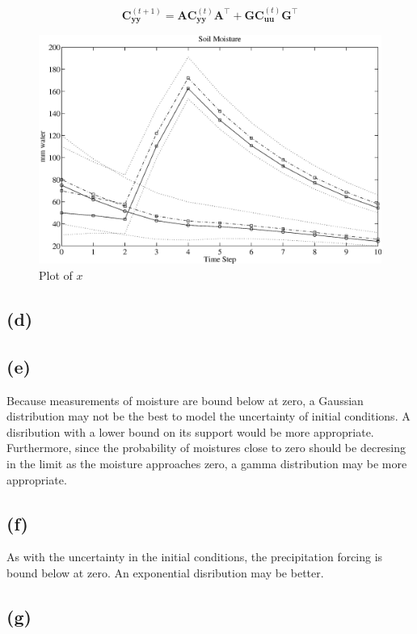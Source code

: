 \documentclass[fleqn, letterpaper]{tufte-handout}
\begin{document}
\[
\mathbf{C}_{\mathbf{yy}}^{(t+1)} = \mathbf{AC}_{\mathbf{yy}}^{(t)}\mathbf{A}^\intercal + \mathbf{GC}_\mathbf{{uu}}^{(t)}\mathbf{G}^\intercal
\]

\begin{figure}
        \includegraphics[width=\textwidth]{ps5figc}
        \caption{Plot of $x$}
        \label{exprnd}
\end{figure}

\subsection{(d)}

\subsection{(e)}

Because measurements of moisture are bound below at zero, a Gaussian distribution may not be the best to model the uncertainty of initial conditions. A disribution with a lower bound on its support would be more appropriate. Furthermore, since the probability of moistures close to zero should be decresing in the limit as the moisture approaches zero, a gamma distribution may be more appropriate.

\subsection{(f)}

As with the uncertainty in the initial conditions, the precipitation forcing is bound below at zero. An exponential disribution may be better. 

\subsection{(g)}
\end{document}
